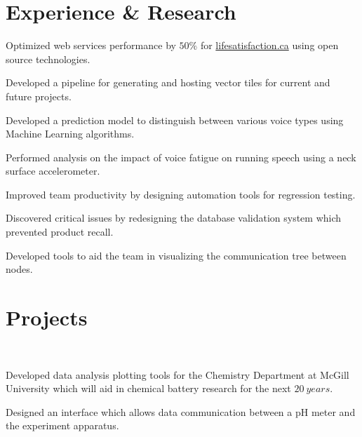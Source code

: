 \documentclass[]{sumbal-resume}
\begin{document}
\begin{minipage}[t]{0.66\textwidth}
\section{Experience \& Research}

\vspace{\topsep}
\begin{tightemize}
\item Optimized web services performance by $50 \%$ for \href{http://lifesatisfaction.ca}{lifesatisfaction.ca} using open source technologies.
\item Developed a pipeline for generating and hosting vector tiles for current and future projects.
\end{tightemize}


\begin{tightemize}
\item Developed a prediction model to distinguish between various voice types using Machine Learning algorithms. 
\item Performed analysis on the impact of voice fatigue on running speech using a neck surface accelerometer.
\end{tightemize}


\begin{tightemize}
\item Improved team productivity by designing automation tools for regression testing. 
\item Discovered critical issues by redesigning the database validation system which prevented product recall.
\item Developed tools to aid the team in visualizing the communication tree between nodes.
\end{tightemize}

\sectionsep
\section{Projects}

 \\
\begin{tightemize}
\item Developed data analysis plotting tools for the Chemistry Department at McGill University which will aid in chemical battery research for the next $20 \ years$. 
\item Designed an interface which allows data communication between a pH meter and the experiment apparatus. 
\end{tightemize}


\end{minipage}
\end{document}

